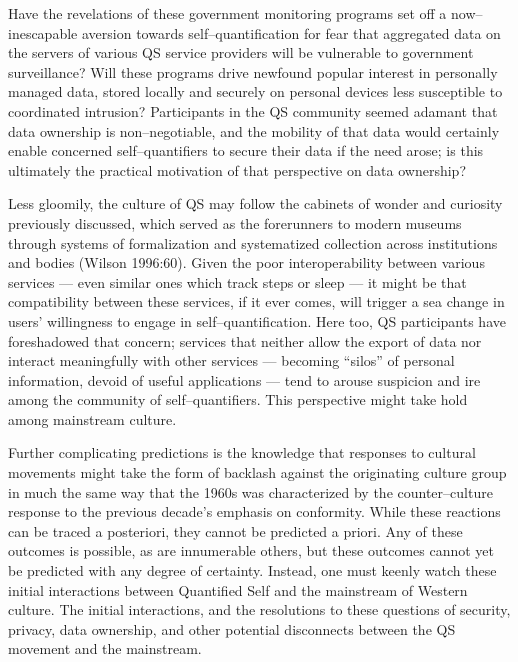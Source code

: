\documentclass{article}
\begin{document}
Have the revelations of these government monitoring programs set off a now--inescapable aversion towards self--quantification for fear that aggregated data on the servers of various QS service providers will be vulnerable to government surveillance? Will these programs drive newfound popular interest in personally managed data,
stored locally and securely on personal devices less susceptible to coordinated intrusion? Participants in the QS community seemed adamant that data ownership is non--negotiable,
and the mobility of that data would certainly enable concerned self--quantifiers to secure their data if the need arose;
is this ultimately the practical motivation of that perspective on data ownership?

Less gloomily,
the culture of QS may follow the cabinets of wonder and curiosity previously discussed,
which served as the forerunners to modern museums through systems of formalization and systematized collection across institutions and bodies
(Wilson 1996:60).
Given the poor interoperability between various services
--- even similar ones which track steps or sleep ---
it might be that compatibility between these services,
if it ever comes,
will trigger a sea change in users' willingness to engage in self--quantification.
Here too,
QS participants have foreshadowed that concern;
services that neither allow the export of data nor interact meaningfully with other services
--- becoming ``silos'' of personal information,
devoid of useful applications
--- tend to arouse suspicion and ire among the community of self--quantifiers.
This perspective might take hold among mainstream culture.

Further complicating predictions is the knowledge that responses to cultural movements might take the form of backlash against the originating culture group in much the same way that the 1960s was characterized by the counter--culture response to the previous decade's emphasis on conformity.
While these reactions can be traced a posteriori,
they cannot be predicted a priori.
Any of these outcomes is possible,
as are innumerable others,
but these outcomes cannot yet be predicted with any degree of certainty.
Instead,
one must keenly watch these initial interactions between Quantified Self and the mainstream of Western culture.
The initial interactions,
and the resolutions to these questions of security,
privacy,
data ownership,
and other potential disconnects between the QS movement and the mainstream.
\end{document}
